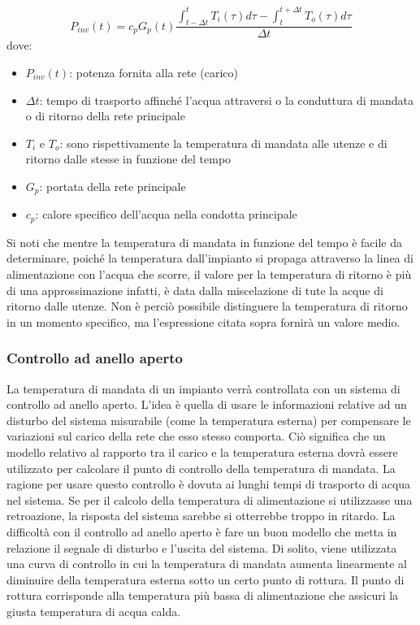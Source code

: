 \documentclass[laurea,oneside,11pt]{USiena_tesiLM}
\begin{document}
\begin{equation}
P_{inv}(t) = c_p G_p(t) \dfrac{\int_{t-\Delta t}^t T_i(\tau)d\tau - \int_{t}^{t + \Delta t } T_o(\tau)d\tau}{\Delta t}
\end{equation}
dove:
\begin{itemize}
\item[] $P_{inv}(t)$:  potenza fornita alla rete (carico)
\item[] $\Delta t$: tempo di trasporto affinché l'acqua attraversi o la conduttura di mandata o di ritorno della rete principale
\item[] $T_i$ e $T_o$: sono rispettivamente la temperatura di mandata alle utenze e di ritorno dalle stesse in funzione del tempo
\item[] $G_p$: portata della rete principale
\item[] $c_p$: calore specifico dell'acqua nella condotta principale
\end{itemize}

Si noti che mentre la temperatura di mandata in funzione del tempo è facile da determinare, poiché la temperatura dall'impianto si propaga attraverso la linea di alimentazione con l'acqua che scorre, il valore per la temperatura di ritorno è più di una approssimazione infatti, è data dalla miscelazione di tute la acque di ritorno dalle utenze. Non è perciò possibile distinguere la temperatura di ritorno in un momento specifico, ma l'espressione citata sopra fornirà un valore medio.

\subsubsection{Controllo ad anello aperto}
La temperatura di mandata di un impianto verrà controllata con un sistema di controllo ad anello aperto. L'idea è quella di usare le informazioni relative ad un disturbo del sistema misurabile (come la temperatura esterna) per compensare le variazioni sul carico della rete che esso stesso comporta. Ciò significa che un modello relativo al rapporto tra il carico e la temperatura esterna dovrà essere utilizzato per calcolare il punto di controllo della temperatura di mandata.
La ragione per usare questo controllo è dovuta ai lunghi tempi di trasporto di acqua nel sistema. Se per il calcolo della temperatura di alimentazione si utilizzasse una retroazione, la risposta del sistema sarebbe si otterrebbe troppo in ritardo.
La difficoltà con il controllo ad anello aperto è fare un buon modello che metta in relazione  il segnale di disturbo e l'uscita del sistema. Di solito, viene utilizzata una curva di controllo in cui la temperatura di mandata aumenta linearmente al diminuire della temperatura esterna sotto un certo punto di rottura. Il punto di rottura corrisponde alla temperatura più bassa di alimentazione che assicuri la giusta temperatura di acqua calda. 
\end{document}

